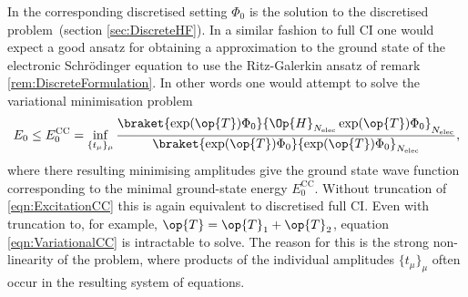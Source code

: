 In the corresponding discretised setting
$\Phi_0$ is the solution to the discretised
\HF problem~(section \vref{sec:DiscreteHF}).
In a similar fashion to full CI one would expect
a good ansatz for obtaining a \CC approximation to
the ground state of the electronic Schrödinger equation
to use the Ritz-Galerkin ansatz of remark \vref{rem:DiscreteFormulation}.
In other words one would attempt to solve the variational minimisation problem
\begin{equation}
E_0 \leq E_0^\text{CC} = \inf_{\{t_\mu\}_{\mu}} \frac{\braket{\exp(\op{T}) \Phi_0}{\Op{H}_{\Nelec} \exp(\op{T}) \Phi_0}_{\Nelec}}
	{\braket{\exp(\op{T}) \Phi_0}{\exp(\op{T}) \Phi_0}_{\Nelec}},
	\label{eqn:VariationalCC}
\end{equation}
where there resulting minimising amplitudes give the \CC ground state
wave function corresponding to the minimal ground-state energy $E_0^\text{CC}$.
Without truncation of \eqref{eqn:ExcitationCC}
this is again equivalent to discretised full CI.
Even with truncation to, for example, $\op{T} = \op{T}_1 + \op{T}_2$,
equation \eqref{eqn:VariationalCC} is intractable to solve.
The reason for this is the strong non-linearity of the problem,
where products of the individual amplitudes $\{t_\mu\}_{\mu}$ often occur
in the resulting system of equations.

